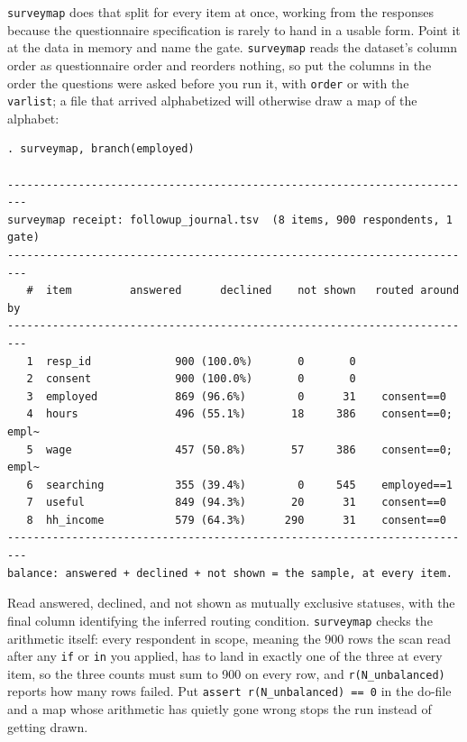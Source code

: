 \texttt{surveymap} does that split for every item at once, working from the responses because the questionnaire specification is rarely to hand in a usable form. Point it at the data in memory and name the gate. \texttt{surveymap} reads the dataset's column order as questionnaire order and reorders nothing, so put the columns in the order the questions were asked before you run it, with \texttt{order} or with the \texttt{varlist}; a file that arrived alphabetized will otherwise draw a map of the alphabet:
\par
{\footnotesize
\begin{verbatim}
. surveymap, branch(employed)

-------------------------------------------------------------------------
surveymap receipt: followup_journal.tsv  (8 items, 900 respondents, 1 gate)
-------------------------------------------------------------------------
   #  item         answered      declined    not shown   routed around by
-------------------------------------------------------------------------
   1  resp_id             900 (100.0%)       0       0
   2  consent             900 (100.0%)       0       0
   3  employed            869 (96.6%)        0      31    consent==0
   4  hours               496 (55.1%)       18     386    consent==0; empl~
   5  wage                457 (50.8%)       57     386    consent==0; empl~
   6  searching           355 (39.4%)        0     545    employed==1
   7  useful              849 (94.3%)       20      31    consent==0
   8  hh_income           579 (64.3%)      290      31    consent==0
-------------------------------------------------------------------------
balance: answered + declined + not shown = the sample, at every item.
\end{verbatim}
}
Read answered, declined, and not shown as mutually exclusive statuses, with the final column identifying the inferred routing condition. \texttt{surveymap} checks the arithmetic itself: every respondent in scope, meaning the 900 rows the scan read after any \texttt{if} or \texttt{in} you applied, has to land in exactly one of the three at every item, so the three counts must sum to 900 on every row, and \texttt{r(N\_unbalanced)} reports how many rows failed. Put \texttt{assert r(N\_unbalanced) == 0} in the do-file and a map whose arithmetic has quietly gone wrong stops the run instead of getting drawn.


